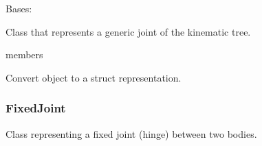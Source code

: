 \documentclass[letterpaper,10pt,english]{sphinxmanual}
\begin{document}
\begin{fulllineitems}
\label{\detokenize{joint:Joint}}
\pysigstartsignatures
{}
\pysigstopsignatures
\sphinxAtStartPar
Bases: {\hyperref[\detokenize{body:Body}]{}}

\sphinxAtStartPar
Class that represents a generic joint of the kinematic tree.

\begin{sphinxuseclass}{members}\begin{description}

\begin{fulllineitems}
\label{\detokenize{joint:Joint.toStruct}}
\pysigstartsignatures
{}
\pysigstopsignatures
\sphinxAtStartPar
Convert object to a struct representation.

\end{fulllineitems}


\end{description}

\end{sphinxuseclass}
\end{fulllineitems}


\sphinxstepscope


\subsubsection{FixedJoint}
\label{\detokenize{fixedjoint:fixedjoint}}\label{\detokenize{fixedjoint::doc}}\label{\detokenize{fixedjoint:module-classes}}
\sphinxAtStartPar
Class representing a fixed joint (hinge) between two bodies.
\end{document}
